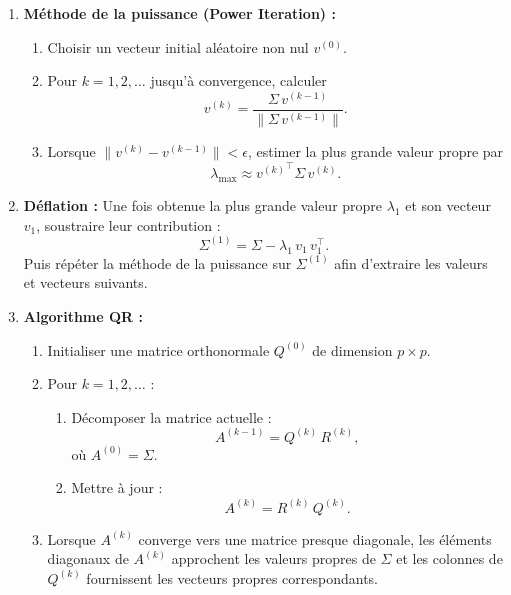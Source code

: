 \documentclass[a4paper,12pt]{report}
\begin{document}
\begin{enumerate}
    \item \textbf{Méthode de la puissance (Power Iteration) :}
    \begin{enumerate}
        \item Choisir un vecteur initial aléatoire non nul \(v^{(0)}\).
        \item Pour \(k=1,2,\ldots\) jusqu'à convergence, calculer
        \[
        v^{(k)} = \frac{\Sigma\, v^{(k-1)}}{\|\Sigma\, v^{(k-1)}\|}.
        \]
        \item Lorsque \(\|v^{(k)} - v^{(k-1)}\| < \epsilon\), estimer la plus grande valeur propre par
        \[
        \lambda_{\max} \approx {v^{(k)}}^\top \Sigma\, v^{(k)}.
        \]
    \end{enumerate}
    \item \textbf{Déflation :}  
    Une fois obtenue la plus grande valeur propre \(\lambda_1\) et son vecteur \(v_1\), soustraire leur contribution :
    \[
    \Sigma^{(1)} = \Sigma - \lambda_1\, v_1\, v_1^\top.
    \]
    Puis répéter la méthode de la puissance sur \(\Sigma^{(1)}\) afin d'extraire les valeurs et vecteurs suivants.
    
    \item \textbf{Algorithme QR :}
    \begin{enumerate}
        \item Initialiser une matrice orthonormale \(Q^{(0)}\) de dimension \(p\times p\).
        \item Pour \(k=1,2,\ldots\) :
        \begin{enumerate}
            \item Décomposer la matrice actuelle :
            \[
            A^{(k-1)} = Q^{(k)}\, R^{(k)},
            \]
            où \(A^{(0)} = \Sigma\).
            \item Mettre à jour :
            \[
            A^{(k)} = R^{(k)}\, Q^{(k)}.
            \]
        \end{enumerate}
        \item Lorsque \(A^{(k)}\) converge vers une matrice presque diagonale, les éléments diagonaux de \(A^{(k)}\) approchent les valeurs propres de \(\Sigma\) et les colonnes de \(Q^{(k)}\) fournissent les vecteurs propres correspondants.
    \end{enumerate}
    

\end{enumerate}
\end{document}
